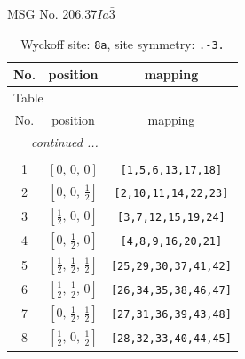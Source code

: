 \documentclass[fleqn,8pt]{jsarticle}
\begin{document}
\setcounter{MaxMatrixCols}{32}

\renewcommand{\tablename}{Table~}
\renewcommand{\figurename}{Figure~}
\begin{center}
\LARGE
MSG No. 206.37\quad$Ia\bar{3}$
\end{center}
\renewcommand{\arraystretch}{1.2}
\begin{longtable}{ccc}
\caption{Wyckoff site: {\tt 8a}, site symmetry: {\tt .-3.}}
 \\
 \hline \hline
No. & position & mapping \\ \hline \endfirsthead

\multicolumn{2}{l}{\tablename\ \thetable{}} \\
 \hline \hline
No. & position & mapping \\ \hline \endhead

 \hline \hline
\multicolumn{2}{r}{\footnotesize\it continued ...} \\ \endfoot

 \hline \hline
\multicolumn{2}{r}{} \\ \endlastfoot

1 & $\left[ 0,\, 0,\, 0 \right]$ & {\tt [1,5,6,13,17,18]} \\ \hline
2 & $\left[ 0,\, 0,\, \frac{1}{2} \right]$ & {\tt [2,10,11,14,22,23]} \\ \hline
3 & $\left[ \frac{1}{2},\, 0,\, 0 \right]$ & {\tt [3,7,12,15,19,24]} \\ \hline
4 & $\left[ 0,\, \frac{1}{2},\, 0 \right]$ & {\tt [4,8,9,16,20,21]} \\ \hline
5 & $\left[ \frac{1}{2},\, \frac{1}{2},\, \frac{1}{2} \right]$ & {\tt [25,29,30,37,41,42]} \\ \hline
6 & $\left[ \frac{1}{2},\, \frac{1}{2},\, 0 \right]$ & {\tt [26,34,35,38,46,47]} \\ \hline
7 & $\left[ 0,\, \frac{1}{2},\, \frac{1}{2} \right]$ & {\tt [27,31,36,39,43,48]} \\ \hline
8 & $\left[ \frac{1}{2},\, 0,\, \frac{1}{2} \right]$ & {\tt [28,32,33,40,44,45]} \\
\end{longtable}
\renewcommand{\arraystretch}{1.2}
\end{document}
